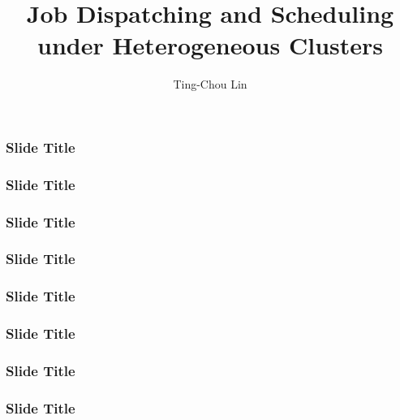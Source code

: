 \documentclass{beamer}
\title{Job Dispatching and Scheduling under Heterogeneous Clusters}
\author{Ting-Chou Lin}
\begin{document}
\begin{frame}
  \frametitle{Slide Title}
\end{frame}
\begin{frame}
  \frametitle{Slide Title}
\end{frame}
\begin{frame}
  \frametitle{Slide Title}
\end{frame}
\begin{frame}
  \frametitle{Slide Title}
\end{frame}
\begin{frame}
  \frametitle{Slide Title}
\end{frame}
\begin{frame}
  \frametitle{Slide Title}
\end{frame}
\begin{frame}
  \frametitle{Slide Title}
\end{frame}
\begin{frame}
  \frametitle{Slide Title}
\end{frame}
\end{document}
